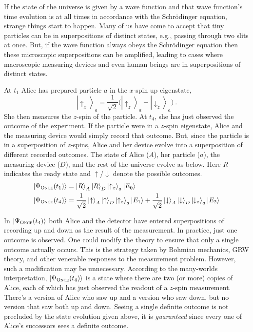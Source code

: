 \documentclass[12pt,onecolumn,secnumarabic,amsmath,amssymb,balancelastpage,nofootinbib]{article}
\newcommand{\ket}[1]{\ensuremath{\left|#1\right\rangle}}
\begin{document}
If the state of the universe is given by a wave function and that wave function's time evolution is at all times in accordance with the Schr\"{o}dinger equation, strange things start to happen.  Many of us have come to accept that tiny particles can be in superpositions of distinct states, e.g., passing through two slits at once.  But, if the wave function always obeys the Schr\"{o}dinger equation then these microscopic superpositions can be amplified, leading to cases where macroscopic measuring devices and even human beings are in superpositions of distinct states.

\begin{description}[font=\normalfont\scshape]
\item[Once] At $t_1$ Alice has prepared particle $a$ in the $x$-spin up eigenstate,
\begin{equation}
\ket{\uparrow_x}_a =  \frac{1}{\sqrt{2}}\Big(\ket{\uparrow_z}_a+\ket{\downarrow_z}_a\Big)\ .
\end{equation}
She then measures the $z$-spin of the particle. At $t_4$, she has just observed the outcome of the experiment.  If the particle were in a $z$-spin eigenstate, Alice and the measuring device would simply record that outcome.  But, since the particle is in a superposition of $z$-spins, Alice and her device evolve into a superposition of different recorded outcomes.  The state of Alice ($A$), her particle ($a$), the measuring device ($D$), and the rest of the universe evolve as below.  Here $R$ indicates the ready state and $\uparrow$/$\downarrow$ denote the possible outcomes.
\begin{align}
\ket{\Psi_{\textsc{Once}}(t_1)}&=\ket{R}_A\ket{R}_{D}\ket{\uparrow_x}_a\ket{E_0}
\nonumber
\\
\ket{\Psi_{\textsc{Once}}(t_4)}&=\frac{1}{\sqrt{2}}\ket{\uparrow}_A\ket{\uparrow}_{D}\ket{\uparrow_z}_a\ket{E_1}+\frac{1}{\sqrt{2}}\ket{\downarrow}_A\ket{\downarrow}_{D}\ket{\downarrow_z}_a\ket{E_2}
\label{once}
\end{align}
\end{description}	

In $\ket{\Psi_{\textsc{Once}}(t_4)}$ both Alice and the detector have entered superpositions of recording up and down as the result of the measurement.  In practice, just one outcome is observed.  One could modify the theory to ensure that only a single outcome actually occurs.  This is the strategy taken by Bohmian mechanics, GRW theory, and other venerable responses to the measurement problem.  However, such a modification may be unnecessary. According to the many-worlds interpretation, $\ket{\Psi_{\textsc{Once}}(t_4)}$ is a state where there are two (or more) copies of Alice, each of which has just observed the readout of a $z$-spin measurement.  There's a version of Alice who saw up and a version who saw down, but no version that saw both up and down.  Seeing a single definite outcome is not precluded by the state evolution given above, it is \emph{guaranteed} since every one of Alice's successors sees a definite outcome.
\end{document}

